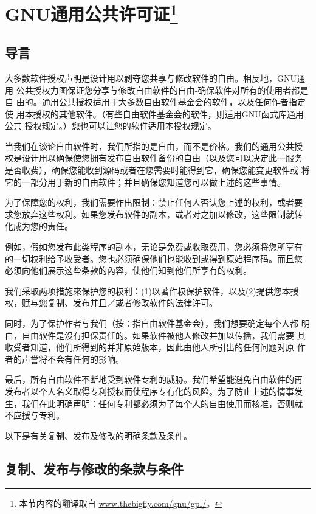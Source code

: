 
\chapter[GNU通用公共许可证]{GNU通用公共许可证\footnote{ 本节内容的翻译取自
  \url{www.thebigfly.com/gnu/gpl/}。}}
\label{chap:app:GPL}

\section{导言}
\label{sec:app:GPL:preamble}
大多数软件授权声明是设计用以剥夺您共享与修改软件的自由。相反地，GNU通用
公共授权力图保证您分享与修改自由软件的自由-确保软件对所有的使用者都是自
由的。通用公共授权适用于大多数自由软件基金会的软件，以及任何作者指定使
用本授权的其他软件。（有些自由软件基金会的软件，则适用GNU函式库通用公共
授权规定。）您也可以让您的软件适用本授权规定。

当我们在谈论自由软件时，我们所指的是自由，而不是价格。我们的通用公共授
权是设计用以确保使您拥有发布自由软件备份的自由（以及您可以决定此一服务
是否收费），确保您能收到源码或者在您需要时能得到它，确保您能变更软件或
将它的一部分用于新的自由软件；并且确保您知道您可以做上述的这些事情。

为了保障您的权利，我们需要作出限制：禁止任何人否认您上述的权利，或者要
求您放弃这些权利。如果您发布软件的副本，或者对之加以修改，这些限制就转
化成为您的责任。

例如，假如您发布此类程序的副本，无论是免费或收取费用，您必须将您所享有
的一切权利给予收受者。您也必须确保他们也能收到或得到原始程序码。而且您
必须向他们展示这些条款的內容，使他们知到他们所享有的权利。

我们采取两项措施來保护您的权利：(1)以著作权保护软件，以及(2)提供您本授
权，赋与您复制、发布并且／或者修改软件的法律许可。

同时，为了保护作者与我们（按：指自由软件基金会），我们想要确定每个人都
明白，自由软件是沒有担保责任的。如果软件被他人修改并加以传播，我们需要
其收受者知道，他们所得到的并非原始版本，因此由他人所引出的任何问题对原
作者的声誉将不会有任何的影响。

最后，所有自由软件不断地受到软件专利的威胁。我们希望能避免自由软件的再
发布者以个人名义取得专利授权而使程序专有化的风险。为了防止上述的情事发
生，我们在此明确声明：任何专利都必须为了每个人的自由使用而核准，否则就
不应授与专利。

以下是有关复制、发布及修改的明确条款及条件。

\section{复制、发布与修改的条款与条件}
\label{sec:app:GPL:termsAndConditions}

